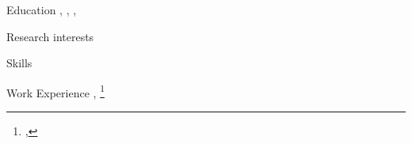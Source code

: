 \documentclass{resume}
\author{~~~~~~Rajan}
\begin{document}
\maketitle


\begin{category}{Education}
\citem{},
\citem{},
\citem{},
\end{category}


\begin{category}{Research interests}
\citemnobullet 
\end{category}

\begin{category}{Skills}
\citemnobullet 

\end{category}

\begin{category}{Work Experience}
\citem{},
\footnote{\url{},} 
\citem{}
\citem{} 

\end{category}


\begin{category}{} 
\citemnobullet
\end{category}
\end{document}
